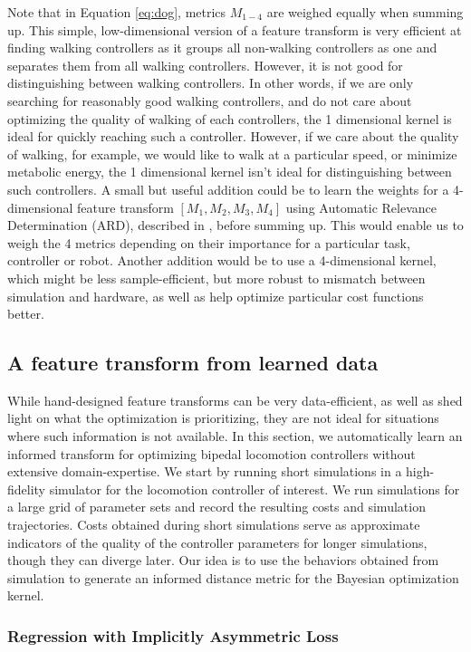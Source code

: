 Note that in Equation \ref{eq:dog}, metrics $M_{1-4}$ are weighed equally when summing up. This simple, low-dimensional version of a feature transform is very efficient at finding walking controllers as it groups all non-walking controllers as one and separates them from all walking controllers. However, it is not good for distinguishing between walking controllers. In other words, if we are only searching for reasonably good walking controllers, and do not care about optimizing the quality of walking of each controllers, the 1 dimensional kernel is ideal for quickly reaching such a controller. However, if we care about the quality of walking, for example, we would like to walk at a particular speed, or minimize metabolic energy, the 1 dimensional kernel isn't ideal for distinguishing between such controllers.
A small but useful addition could be to learn the weights for a 4-dimensional feature transform $[M_1, M_2, M_3, M_4]$ using Automatic Relevance Determination (ARD), described in \cite{GPsMLBook}, before summing up. This would enable us to weigh the 4 metrics depending on their importance for a particular task, controller or robot. Another addition would be to use a 4-dimensional kernel, which might be less sample-efficient, but more robust to mismatch between simulation and hardware, as well as help optimize particular cost functions better. 


\subsection{A feature transform from learned data}

While hand-designed feature transforms can be very data-efficient, as well as shed light on what the optimization is prioritizing, they are not ideal for situations where such information is not available. In this section, we automatically learn an informed transform for optimizing bipedal locomotion controllers without extensive domain-expertise. We start by running short simulations in a high-fidelity simulator for the locomotion controller of interest. 
We run simulations for a large grid of parameter sets and record the resulting costs and simulation trajectories. Costs obtained during short simulations serve as approximate indicators of the quality of the controller parameters for longer simulations, though they can diverge later. Our idea is to use the behaviors obtained from simulation to generate an informed distance metric for the Bayesian optimization kernel. 

\subsubsection{Regression with Implicitly Asymmetric Loss}
\label{sec:approach_asym}

